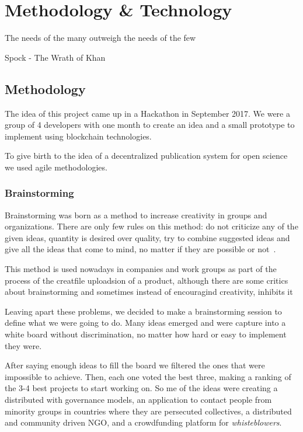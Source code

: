 \chapter{Methodology \& Technology}

\begin{FraseCelebre}
  \begin{Frase}
    The needs of the many outweigh the needs of the few
  \end{Frase}
  \begin{Fuente}
    Spock - The Wrath of Khan
  \end{Fuente}
\end{FraseCelebre}

\section{Methodology}
The idea of this project came up in a Hackathon in September 2017. We were a
group of 4 developers with one month to create an idea and a small prototype to
implement using blockchain technologies.

To give birth to the idea of a decentralized publication system for open science
we used agile methodologies.


\subsection{Brainstorming}

Brainstorming was born as a method to increase creativity in groups and
organizations. There are only few rules on this method: do not criticize any of
the given ideas, quantity is desired over quality, try to combine suggested
ideas and give all the ideas that come to mind, no matter if they are possible
or not~\cite{osborn1953applied}.

This method is used nowadays in companies and work groups as part of the process
of the creatfile uploadsion of a product, although there are some critics about
brainstorming and sometimes instead of encouragind creativity, inhibits
it~\cite{sutton1996brainstorming,mullen1991productivity}

Leaving apart these problems, we decided to make a brainstorming session to
define what we were going to do. Many ideas emerged and were capture into a
white board without discrimination, no matter how hard or easy to implement they
were.

After saying enough ideas to fill the board we filtered the ones that were
impossible to achieve. Then, each one voted the best three, making a ranking of
the 3-4 best projects to start working on. So me of the ideas were creating a
distributed  with governance models, an application to contact
people from minority groups in countries where they are persecuted collectives,
a distributed and community driven NGO, and a crowdfunding platform for
\emph{whisteblowers}.

